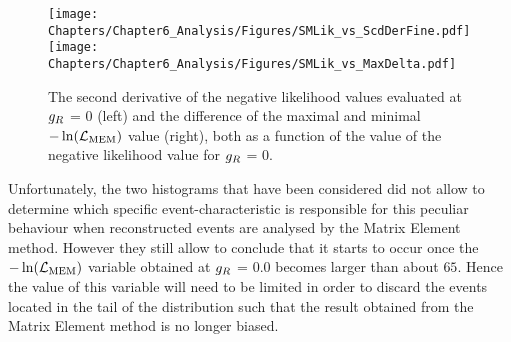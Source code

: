 \begin{figure}[h!t]
 \centering
 \texttt{[image: Chapters/Chapter6\_Analysis/Figures/SMLik\_vs\_ScdDerFine.pdf]} \vspace{0.2cm}
 \texttt{[image: Chapters/Chapter6\_Analysis/Figures/SMLik\_vs\_MaxDelta.pdf]} 
 \caption{The second derivative of the negative likelihood values evaluated at $g_{R}$ = 0 (left) and the difference of the maximal and minimal $-\ln(\mathcal{L}_{\textrm{MEM}})$ value (right), both as a function of the value of the negative likelihood value for $g_{R}$ = 0.} \label{fig::SMLik2D}
\end{figure}

Unfortunately, the two histograms that have been considered did not allow to determine which specific event-characteristic is responsible for this peculiar behaviour when reconstructed events are analysed by the Matrix Element method.
However they still allow to conclude that it starts to occur once the $-\ln(\mathcal{L}_{\textrm{MEM}})$ variable obtained at $g_{R}$ = 0.0 becomes larger than about $65$.
Hence the value of this variable will need to be limited in order to discard the events located in the tail of the distribution such that the result obtained from the Matrix Element method is no longer biased.

